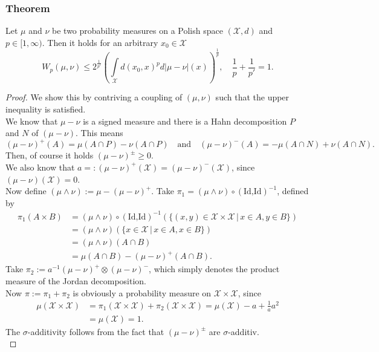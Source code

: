\documentclass[11pt,a4paper]{article}
\begin{document}
\subsubsection{Theorem}
Let $\mu$ and $\nu$ be two probability measures on a Polish space  $(\mathcal{X},d)$ and $p\in[1,\infty)$. Then it holds for an arbitrary $x_0\in\mathcal{X}$
\[
W_p(\mu,\nu)\leq{}2^\frac{1}{p'}\left(\int\limits_{\mathcal{X}}d(x_0,x)^pd|\mu-\nu|(x)\right)^\frac{1}{p},\quad\frac{1}{p}+\frac{1}{p'}=1.
\]
\begin{proof}
We show this by contriving a coupling of $(\mu,\nu)$ such that the upper inequality is satisfied.\vspace{2em}\\
We know that $\mu-\nu$ is a signed measure and there is a Hahn decomposition $P$ and $N$ of $(\mu-\nu)$. This means
\[
(\mu-\nu)^{+}(A) = \mu(A\cap{}P)-\nu(A\cap{}P)\quad\text{and}\quad (\mu-\nu)^{-}(A) = -\mu(A\cap{}N)+\nu(A\cap{}N).
\]
Then, of course it holds $(\mu-\nu)^{\pm}\geq{}0$.\vspace{1em}\\We also know that $a =: (\mu-\nu)^{+}(\mathcal{X})=(\mu-\nu)^{-}(\mathcal{X})$, since $(\mu-\nu)(\mathcal{X})=0$.\vspace{1em}\\
Now define $(\mu\wedge\nu):=\mu-(\mu-\nu)^{+}$. Take $\pi_1=(\mu\wedge\nu)\circ{}(\text{Id,Id})^{-1}$, defined by
\begin{align*}
\pi_1(A\times{}B)&=(\mu\wedge\nu)\circ{}(\text{Id,Id})^{-1}(\lbrace(x,y)\in\mathcal{X\times{}X}\,|\,x\in{}A,y\in{}B\rbrace) \\&= (\mu\wedge\nu)(\lbrace{}x\in\mathcal{X}\,|\,x\in{}A,x\in{}B\rbrace) \\&= (\mu\wedge\nu)(A\cap{}B) \\&= \mu(A\cap{}B) - (\mu-\nu)^{+}(A\cap{}B).
\end{align*}
Take $\pi_2:=a^{-1}(\mu-\nu)^{+}\otimes{}(\mu-\nu)^{-}$, which simply denotes the product measure of the Jordan decomposition. \vspace{1em}\\
Now $\pi:=\pi_1+\pi_2$ is obviously a probability measure on $\mathcal{X\times{}X}$, since
\begin{align*}
\mu(\mathcal{X\times{}X}) &= \pi_1(\mathcal{X\times{}X})+\pi_2(\mathcal{X\times{}X}) = \mu(\mathcal{X})-a+\frac{1}{a}
a^2 \\&= \mu(\mathcal{X})=1.
\end{align*}
The $\sigma$-additivity follows from the fact that $(\mu-\nu)^{\pm}$ are $\sigma$-additiv.\\

\end{proof}
\end{document}
